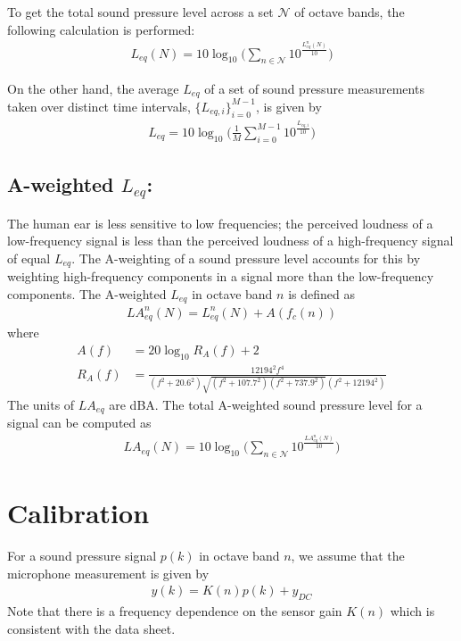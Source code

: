 \documentclass{article}
\begin{document}
To get the total sound pressure level across a set $\mathcal{N}$ of octave bands, the following calculation is performed:
\begin{align*}
    L_{eq}(N) = 10 \log_{10}\bigg( \sum_{n \in \mathcal{N}} 10^{\frac{L_{eq}^n(N)}{10}} \bigg)
\end{align*}

On the other hand, the average $L_{eq}$ of a set of sound pressure measurements taken over distinct time intervals, $\{L_{eq,i}\}_{i = 0}^{M-1}$, is given by
\begin{align*}
    L_{eq} = 10 \log_{10}\bigg( \frac{1}{M} \sum_{i = 0}^{M-1} 10^{\frac{L_{eq,i}}{10}} \bigg)
\end{align*}

\subsection{A-weighted $L_{eq}$:} The human ear is less sensitive to low frequencies; the perceived loudness of a low-frequency signal is less than the perceived loudness of a high-frequency signal of equal $L_{eq}$. The A-weighting of a sound pressure level accounts for this by weighting high-frequency components in a signal more than the low-frequency components. The A-weighted $L_{eq}$ in octave band $n$ is defined as
\begin{align*}
    LA_{eq}^n(N) = L_{eq}^n(N) + A(f_c(n))
\end{align*}
where
\begin{align*}
    A(f) &= 20 \log_{10} R_A(f) + 2 \\
    R_A(f) &= \frac{12194^2 f^4}{(f^2 + 20.6^2)\sqrt{(f^2+107.7^2)(f^2+737.9^2)}(f^2+12194^2)}
\end{align*}
The units of $LA_{eq}$ are dBA. The total A-weighted sound pressure level for a signal can be computed as
\begin{align*}
    LA_{eq}(N) = 10 \log_{10}\bigg( \sum_{n \in \mathcal{N}} 10^{\frac{LA_{eq}^n(N)}{10}} \bigg)
\end{align*}

\section{Calibration}

For a sound pressure signal $p(k)$ in octave band $n$, we assume that the microphone measurement is given by
\begin{align*}
    y(k) = K(n) p(k) + y_{DC}
\end{align*}
Note that there is a frequency dependence on the sensor gain $K(n)$ which is consistent with the data sheet.
\end{document}
